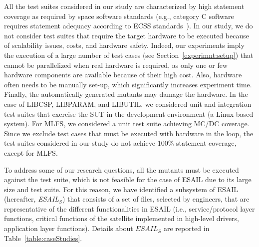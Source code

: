 All the test suites considered in our study are characterized by high statement coverage  as required by space software standards (e.g., category C software requires statement adequacy according to ECSS standards~\cite{ecss80C}). 
In our study, we do not consider test suites that require the target hardware to be executed because of scalability issues, costs, and hardware safety. Indeed, our experiments imply the execution of a large number of test cases (see Section~\ref{experimnt:setup}) that cannot be parallelized when real hardware is required, as only one or few hardware components are available because of their high cost. Also, hardware often needs to be manually set-up, which significantly increases experiment time. Finally, the automatically generated mutants may damage the hardware.
In the case of LIBCSP, LIBPARAM, and LIBUTIL, we considered unit and integration test suites that exercise the SUT in the development environment (a Linux-based system).
For MLFS, we considered a unit test suite achieving MC/DC coverage.
Since we exclude test cases that must be executed with hardware in the loop, the test suites considered in our study do not achieve 100\% statement coverage, except for MLFS.


To address some of our research questions, all the mutants must be executed against the test suite, which is not feasible for the case of ESAIL due to its large size and test suite. For this reason, we have identified a subsystem of ESAIL (hereafter, \emph{ESAIL}$_{S}$) that consists of a set of files, selected by \LXS engineers, that are representative of the different functionalities in ESAIL (i.e., service/protocol layer functions, critical functions of the satellite implemented in high-level drivers, application layer functions).
Details about $\mathit{ESAIL}_{S}$ are reported in Table~\ref{table:caseStudies}.


